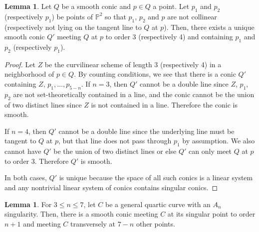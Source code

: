 \documentclass{article}
\theoremstyle{definition}
\newtheorem{lem}[thm]{Lemma}
\newcommand{\mb}{\mathbb}
\begin{document}
\begin{lem}
\label{interpolate}
Let $Q$ be a smooth conic and $p\in Q$ a point. Let $p_1$ and $p_2$ (respectively $p_1$) be points of $\mb{P}^2$ so that $p_1$, $p_2$ and $p$ are not collinear  (respectively not lying on the tangent line to $Q$ at $p$).  Then, there exists a unique smooth conic $Q'$ meeting $Q$ at $p$ to order 3 (respectively 4) and containing $p_1$ and $p_2$ (respectively $p_1$). 
\end{lem}

\begin{proof}
Let $Z$ be the curvilinear scheme of length 3 (respectively 4) in a neighborhood of $p\in Q$.
By counting conditions, we see that there is a conic $Q'$ containing $Z$, $p_1,\ldots,p_{5-n}$. If $n=3$, then $Q'$ cannot be a double line since $Z$, $p_1$, $p_2$ are not set-theoretically contained in a line, and the conic cannot be the union of two distinct lines since $Z$ is not contained in a line. Therefore the conic is smooth. 

If $n=4$, then $Q'$ cannot be a double line since the underlying line must be tangent to $Q$ at $p$, but that line does not pass through $p_1$ by assumption. We also cannot have $Q'$ be the union of two distinct lines or else $Q'$ can only meet $Q$ at $p$ to order 3. Therefore $Q'$ is smooth.

In both cases, $Q'$ is unique because the space of all such conics is a linear system and any nontrivial linear system of conics contains singular conics. 
\end{proof}

\begin{lem}
\label{coniclemma}
For $3\leq n\leq 7$, let $C$ be a general quartic curve with an $A_n$ singularity. Then, there is a smooth conic meeting $C$ at its singular point to order $n+1$ and meeting $C$ transversely at $7-n$ other points. 
\end{lem}
\end{document}
